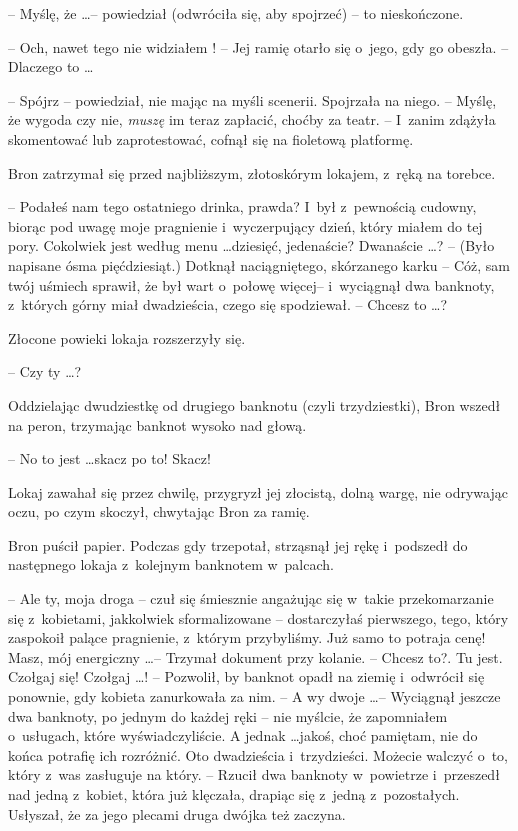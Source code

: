 \documentclass[oneside,polish,11pt,rmheadings]{mwbk}
\begin{document}
-- Myślę, że  \ldots  -- powiedział (odwróciła się, aby spojrzeć) -- to nieskończone. 

-- Och, nawet tego nie widziałem ! -- Jej ramię otarło się o~jego, gdy go obeszła. -- Dlaczego to \ldots  

-- Spójrz -- powiedział, nie mając na myśli scenerii. Spojrzała na niego. -- Myślę, że wygoda czy nie, \textit{muszę }im teraz zapłacić, choćby za teatr. -- I~zanim zdążyła skomentować lub zaprotestować, cofnął się na fioletową platformę. 

Bron zatrzymał się przed najbliższym, złotoskórym lokajem, z~ręką na torebce. 

-- Podałeś nam tego ostatniego drinka, prawda? I~był z~pewnością cudowny, biorąc pod uwagę moje pragnienie i~wyczerpujący dzień, który miałem do tej pory. Cokolwiek jest według menu \ldots  dziesięć, jedenaście? Dwanaście  \ldots ? -- (Było napisane ósma pięćdziesiąt.) Dotknął naciągniętego, skórzanego karku -- Cóż, sam twój uśmiech sprawił, że był wart o~połowę więcej-- i~wyciągnął dwa banknoty, z~których górny miał dwadzieścia, czego się spodziewał. -- Chcesz to \ldots ? 

Złocone powieki lokaja rozszerzyły się. 

-- Czy ty  \ldots  ? 

Oddzielając dwudziestkę od drugiego banknotu (czyli trzydziestki), Bron wszedł na peron, trzymając banknot wysoko nad głową. 

-- No to jest \ldots  skacz po to! Skacz! 

Lokaj zawahał się przez chwilę, przygryzł jej złocistą, dolną wargę, nie odrywając oczu, po czym skoczył, chwytając Bron za ramię. 

Bron puścił papier. Podczas gdy trzepotał, strząsnął jej rękę i~podszedł do następnego lokaja z~kolejnym banknotem w~palcach. 

-- Ale ty, moja droga -- czuł się śmiesznie angażując się w~takie przekomarzanie się z~kobietami, jakkolwiek sformalizowane -- dostarczyłaś pierwszego, tego, który zaspokoił palące pragnienie, z~którym przybyliśmy. Już samo to potraja cenę! Masz, mój energiczny \ldots  -- Trzymał dokument przy kolanie. -- Chcesz to?. Tu jest. Czołgaj się! Czołgaj  \ldots  ! -- Pozwolił, by banknot opadł na ziemię i~odwrócił się ponownie, gdy kobieta zanurkowała za nim. -- A wy dwoje \ldots  -- Wyciągnął jeszcze dwa banknoty, po jednym do każdej ręki -- nie myślcie, że zapomniałem o~usługach, które wyświadczyliście. A jednak \ldots  jakoś, choć pamiętam, nie do końca potrafię ich rozróżnić. Oto dwadzieścia i~trzydzieści. Możecie walczyć o~to, który z~was zasługuje na który. -- Rzucił dwa banknoty w~powietrze i~przeszedł nad jedną z~kobiet, która już klęczała, drapiąc się z~jedną z~pozostałych. Usłyszał, że za jego plecami druga dwójka też zaczyna. 
\end{document}
